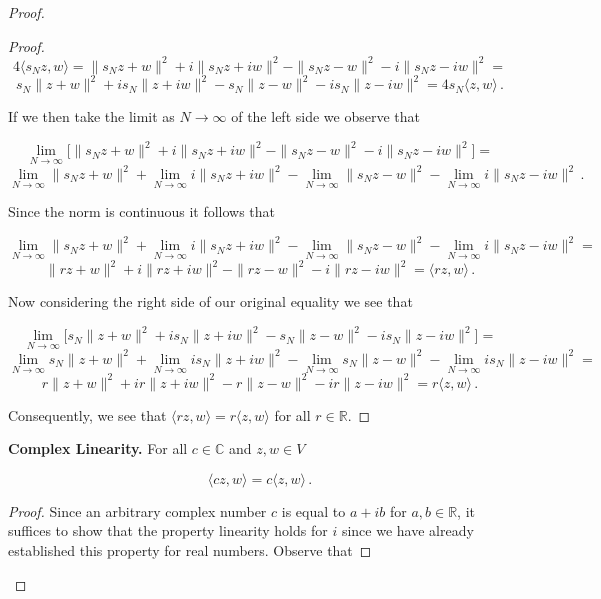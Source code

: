 \documentclass[a4paper]{article}
\numberwithin{equation}{section}
\begin{document}
\begin{description}
\begin{proof}
\begin{description}
\begin{proof}
$$4\langle s_Nz,w \rangle = \|s_Nz+w\|^2 + i\|s_Nz+iw\|^2 - \|s_Nz-w\|^2 - i\|s_Nz-iw\|^2 = $$
$$s_N\|z+w\|^2 + is_N\|z+iw\|^2 - s_N\|z-w\|^2 - is_N\|z-iw\|^2 = 4s_N\langle z,w \rangle\,.$$

If we then take the limit as $N \rightarrow \infty$ of the left side we observe that

$$\lim\limits_{N \rightarrow \infty}\Big[\|s_Nz+w\|^2 + i\|s_Nz+iw\|^2 - \|s_Nz-w\|^2 - i\|s_Nz-iw\|^2 \Big] = $$
$$\lim\limits_{N \rightarrow \infty}\|s_Nz+w\|^2 + \lim\limits_{N \rightarrow \infty}i\|s_Nz+iw\|^2 - \lim\limits_{N \rightarrow \infty}\|s_Nz-w\|^2 - \lim\limits_{N \rightarrow \infty}i\|s_Nz-iw\|^2\,. $$

Since the norm is continuous it follows that

$$\lim\limits_{N \rightarrow \infty}\|s_Nz+w\|^2 + \lim\limits_{N \rightarrow \infty}i\|s_Nz+iw\|^2 - \lim\limits_{N \rightarrow \infty}\|s_Nz-w\|^2 - \lim\limits_{N \rightarrow \infty}i\|s_Nz-iw\|^2 = $$
$$\|rz+w\|^2 + i\|rz+iw\|^2 - \|rz-w\|^2 - i\|rz-iw\|^2 = \langle rz,w \rangle\,. $$

Now considering the right side of our original equality we see that

$$\lim\limits_{N \rightarrow \infty}\Big[s_N\|z+w\|^2 + is_N\|z+iw\|^2 - s_N\|z-w\|^2 - is_N\|z-iw\|^2 \Big] =$$
$$\lim\limits_{N \rightarrow \infty}s_N\|z+w\|^2 + \lim\limits_{N \rightarrow \infty} is_N\|z+iw\|^2 -\lim\limits_{N \rightarrow \infty} s_N\|z-w\|^2 - \lim\limits_{N \rightarrow \infty}is_N\|z-iw\|^2 =$$
$$r\|z+w\|^2 + ir\|z+iw\|^2 - r\|z-w\|^2 - ir\|z-iw\|^2 = r\langle z,w \rangle\,.$$

Consequently, we see that $\langle rz,w \rangle = r\langle z,w \rangle$ for all $r \in \mathbb{R}$.

\end{proof}

\end{description}



\begin{description}

\item\textbf{Complex Linearity.} For all $c \in \mathbb{C}$ and $z,w \in V$

$$\langle cz,w \rangle = c\langle z,w \rangle\,.$$

\begin{proof} Since an arbitrary complex number $c$ is equal to $a+ib$ for $a,b \in \mathbb{R}$, it suffices to show that the property linearity holds for $i$ since we have already established this property for real numbers. Observe that


\end{proof}
\end{description}
\end{proof}
\end{description}
\end{document}
